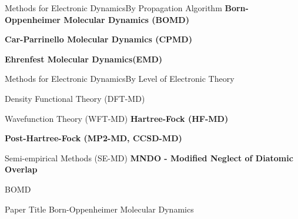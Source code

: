 \begin{frame}{Methods for Electronic Dynamics}{By Propagation Algorithm}
    \textbf{Born-Oppenheimer Molecular Dynamics (BOMD)}
    \vspace{1em}
    
    \textbf{Car-Parrinello Molecular Dynamics (CPMD)}
    \vspace{1em}
    
    \textbf{Ehrenfest Molecular Dynamics(EMD)}
\end{frame}

\begin{frame}{Methods for Electronic Dynamics}{By Level of Electronic Theory}
    \begin{block}{Density Functional Theory (DFT-MD)}
    \end{block}
    
    \begin{block}{Wavefunction Theory (WFT-MD)}
        \textbf{Hartree-Fock (HF-MD)}
        \vspace{0.5em}
        
        \textbf{Post-Hartree-Fock (MP2-MD, CCSD-MD)}
    \end{block}
    
    \begin{block}{Semi-empirical Methods (SE-MD)}
    	\textbf{MNDO - Modified Neglect of Diatomic Overlap}
    \end{block}
\end{frame}


\begin{frame}{BOMD}
	\begin{block}{Paper Title}
  Born-Oppenheimer Molecular Dynamics	
	\end{block}
\end{frame}


